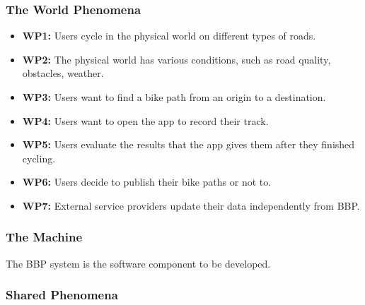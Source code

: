 \subsubsection*{The World Phenomena}
\begin{itemize}
\item[] \textbf{WP1:} Users cycle in the physical world on different types of roads.
\item[] \textbf{WP2:} The physical world has various conditions, such as road quality, obstacles, weather.
\item[] \textbf{WP3:} Users want to find a bike path from an origin to a destination.
\item[] \textbf{WP4:} Users want to open the app to record their track.
\item[] \textbf{WP5:} Users evaluate the results that the app gives them after they finished cycling.
\item[] \textbf{WP6:} Users decide to publish their bike paths or not to.
\item[] \textbf{WP7:} External service providers update their data independently from BBP.
\end{itemize}

\subsubsection*{The Machine}
The BBP system is the software component to be developed.

\subsubsection*{Shared Phenomena}


